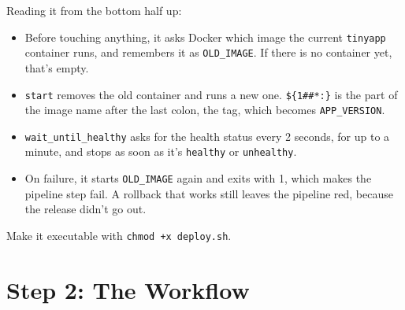 \begin{codeblock}
\begin{Shaded}
\begin{Highlighting}[]
 \KeywordTok{;} 
   

 
 \BuiltInTok{[}   \BuiltInTok{]}\KeywordTok{;} 
   
   
   \KeywordTok{\&\&}  
\end{Highlighting}
\end{Shaded}

\end{codeblock}

Reading it from the bottom half up:

\begin{itemize}
\tightlist
\item
  Before touching anything, it asks Docker which image the current \texttt{tinyapp} container runs, and remembers it as \texttt{OLD\_IMAGE}. If there is no container yet, that's empty.
\item
  \texttt{start} removes the old container and runs a new one. \texttt{\$\{1\#\#*:\}} is the part of the image name after the last colon, the tag, which becomes \texttt{APP\_VERSION}.
\item
  \texttt{wait\_until\_healthy} asks for the health status every 2 seconds, for up to a minute, and stops as soon as it's \texttt{healthy} or \texttt{unhealthy}.
\item
  On failure, it starts \texttt{OLD\_IMAGE} again and exits with 1, which makes the pipeline step fail. A rollback that works still leaves the pipeline red, because the release didn't go out.
\end{itemize}

Make it executable with \texttt{chmod\ +x\ deploy.sh}.


\section{Step 2: The Workflow}\label{10-lab-deploy-on-every-push:step-2-the-workflow}

